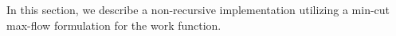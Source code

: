 In this section, we describe a non-recursive implementation utilizing a min-cut max-flow formulation for the work function. 